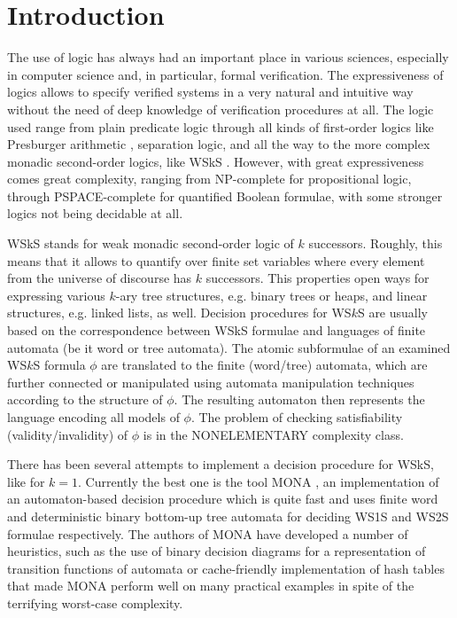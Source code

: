 
\chapter{Introduction}
 
The use of logic has always had an important place in various sciences, especially in computer science and, in particular, formal verification. The expressiveness of logics allows to specify verified systems in a very natural and intuitive way without the need of deep knowledge of verification procedures at all. The logic used range from plain predicate logic through all kinds of first-order logics like Presburger arithmetic \cite{presburger}, separation logic, and all the way to the more complex monadic second-order logics, like WSkS \cite{wsks}. However, with great expressiveness comes great complexity, ranging from NP-complete for propositional logic, through PSPACE-complete for quantified Boolean formulae, with some stronger logics not being decidable at all.

WSkS stands for weak monadic second-order logic of $k$ successors. Roughly, this
means that it allows to quantify over finite set variables where every element
from the universe of discourse has $k$ successors. This properties open ways for expressing various $k$-ary tree structures, e.g. binary trees or heaps, and linear structures, e.g. linked lists, as well. Decision procedures for WS$k$S are usually based on the correspondence between WSkS formulae and languages of finite automata (be it word or tree automata). The atomic subformulae of an examined WS$k$S formula $\phi$ are translated to the finite (word/tree) automata, which are further connected or manipulated using automata manipulation techniques according to the structure of $\phi$. The resulting automaton then represents the language encoding all models of $\phi$. The problem of checking satisfiability (validity/invalidity) of $\phi$ is in the NONELEMENTARY complexity class.

There has been several attempts to implement a decision procedure for WSkS, like \cite{nfa} for $k = 1$. Currently the best one is the tool \textsc{MONA} \cite{mona}, an implementation of an automaton-based decision procedure which is quite fast and uses finite word and deterministic binary bottom-up tree automata for deciding WS1S and WS2S formulae respectively. The authors of \textsc{MONA} have developed a number of heuristics, such as the use of binary decision diagrams for a representation of transition functions of automata or cache-friendly implementation of hash tables that made \textsc{MONA} perform well on many practical examples in spite of the terrifying worst-case complexity. 

